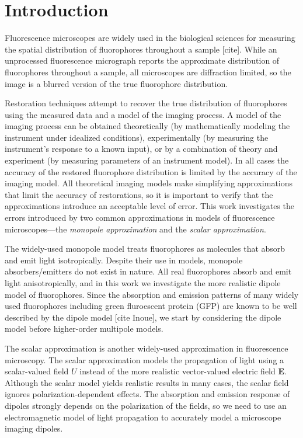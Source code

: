 \documentclass[]{osa-article}
\providecommand{\mb}[1]{\mathbf{#1}}
\begin{document}
\section{Introduction}

Fluorescence microscopes are widely used in the biological sciences for
measuring the spatial distribution of fluorophores throughout a sample [cite].
While an unprocessed fluorescence micrograph reports the approximate
distribution of fluorophores throughout a sample, all microscopes are
diffraction limited, so the image is a blurred version of the true
fluorophore distribution. 

Restoration techniques attempt to recover the true distribution of fluorophores
using the measured data and a model of the imaging process. A model of the
imaging process can be obtained theoretically (by mathematically modeling the
instrument under idealized conditions), experimentally (by measuring the
instrument's response to a known input), or by a combination of theory and
experiment (by measuring parameters of an instrument model). In all cases the
accuracy of the restored fluorophore distribution is limited by the accuracy of
the imaging model. All theoretical imaging models make simplifying
approximations that limit the accuracy of restorations, so it is important to
verify that the approximations introduce an acceptable level of error. This work
investigates the errors introduced by two common approximations in models of
fluorescence microscopes---the \textit{monopole approximation} and the
\textit{scalar approximation}.

The widely-used monopole model treats fluorophores as molecules that absorb and
emit light isotropically. Despite their use in models, monopole
absorbers/emitters do not exist in nature. All real fluorophores absorb and emit
light anisotropically, and in this work we investigate the more realistic dipole
model of fluorophores. Since the absorption and emission patterns of many widely
used fluorophores including green fluroescent protein (GFP) are known to be well
described by the dipole model [cite Inoue], we start by considering the dipole
model before higher-order multipole models.

The scalar approximation is another widely-used approximation in fluorescence
microscopy. The scalar approximation models the propagation of light using a
scalar-valued field $U$ instead of the more realistic vector-valued electric
field $\mb{E}$. Although the scalar model yields realistic results in many
cases, the scalar field ignores polarization-dependent effects. The absorption
and emission response of dipoles strongly depends on the polarization of the
fields, so we need to use an electromagnetic model of light propagation to
accurately model a microscope imaging dipoles.
\end{document}
